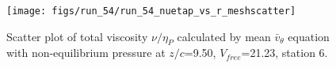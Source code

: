 \begin{figure}[H]
\centering
\texttt{[image: figs/run\_54/run\_54\_nuetap\_vs\_r\_meshscatter]}
\caption{Scatter plot of total viscosity $\nu / \eta_P$ calculated by mean $\bar{v}_{\theta}$ equation with non-equilibrium pressure at $z/c$=9.50, $V_{free}$=21.23, station 6.}
\label{fig:run_54_nuetap_vs_r_meshscatter}
\end{figure}



